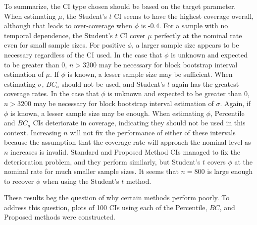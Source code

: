 \documentclass[12pt, letterpaper, titlepage]{article}
\begin{document}
To summarize, the CI type chosen should be based on the target parameter. 
When estimating $\mu$, the Student's $t$ CI seems to have the highest coverage
overall, although that leads to over-coverage when $\phi$ is -0.4. For a
sample with no temporal dependence, the Student's $t$ CI cover $\mu$ perfectly
at the nominal rate even for small sample sizes. For positive $\phi$, a larger
sample size appears to be necessary regardless of the CI used. In the case
that $\phi$ is unknown and expected to be greater than $0$, $n > 3200$ may be
necessary for block bootstrap interval estimation of $\mu$. If $\phi$ is known,
a lesser sample size may be sufficient. When estimating $\sigma$,
$BC_a$ should not be used, and Student's $t$ again has the greatest coverage
rates. In the case that $\phi$ is unknown and expected to be greater than $0$,
$n > 3200$ may be necessary for block bootstrap interval estimation of
$\sigma$. Again, if $\phi$ is known, a lesser sample size may be enough.
When estimating $\phi$, Percentile and $BC_a$ CIs 
deteriorate in coverage, indicating they should not be used in this context. 
Increasing $n$ will not fix the performance of either of these intervals 
because the assumption that the coverage rate will approach the nominal level
as $n$ increases is invalid. Standard and Proposed Method CIs managed to fix the
deterioration problem, and they perform similarly, but Student's $t$ covers
$\phi$ at the nominal rate for much smaller sample sizes. It seems that 
$n = 800$ is large enough to
recover $\phi$ when using the Student's $t$ method.

These results beg the question of why certain methods perform poorly. To address this question, plots of 100 CIs using each of the Percentile, $BC$, and Proposed methods were constructed. 
\end{document}
